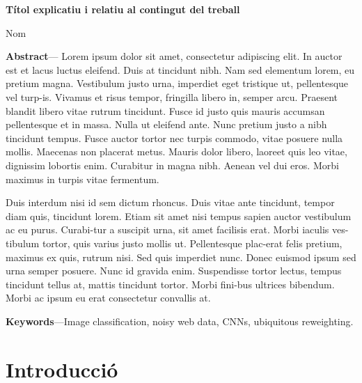﻿\documentclass[10pt,a4paper,twocolumn,twoside]{article}
\begin{document}
{\sffamily
\noindent\textbf{\LARGE Títol explicatiu i relatiu al contingut del treball}
\begin{center}
Nom
\end{center}

\bigskip
\bigskip

\noindent 
\textbf{Abstract}--- Lorem ipsum dolor sit amet, consectetur adipiscing elit. In auctor est et lacus luctus eleifend. Duis at tincidunt nibh. Nam sed elementum lorem, eu pretium magna. Vestibulum justo urna, imperdiet eget tristique ut, pellentesque vel turp-is. Vivamus et risus tempor, fringilla libero in, semper arcu. Praesent blandit libero vitae rutrum tincidunt. Fusce id justo quis mauris accumsan pellentesque et in massa. Nulla ut eleifend ante. Nunc pretium justo a nibh tincidunt tempus. Fusce auctor tortor nec turpis commodo, vitae posuere nulla mollis. Maecenas non placerat metus. Mauris dolor libero, laoreet quis leo vitae, dignissim lobortis enim. Curabitur in magna nibh. Aenean vel dui eros. Morbi maximus in turpis vitae fermentum.

Duis interdum nisi id sem dictum rhoncus. Duis vitae ante tincidunt, tempor diam quis, tincidunt lorem. Etiam sit amet nisi tempus sapien auctor vestibulum ac eu purus. Curabi-tur a suscipit urna, sit amet facilisis erat. Morbi iaculis ves-tibulum tortor, quis varius justo mollis ut. Pellentesque plac-erat felis pretium, maximus ex quis, rutrum nisi. Sed quis imperdiet nunc. Donec euismod ipsum sed urna semper posuere. Nunc id gravida enim. Suspendisse tortor lectus, tempus tincidunt tellus at, mattis tincidunt tortor. Morbi fini-bus ultrices bibendum. Morbi ac ipsum eu erat consectetur convallis at. 

\bigskip

\noindent 
\textbf{Keywords}---Image classification, noisy web data, CNNs, ubiquitous reweighting.
}
\bigskip

{\vrule depth 0pt height 0.5pt width 3cm\hspace{7.5pt}%
%
\hspace{7.5pt}\vrule depth 0pt height 0.5pt width 3cm\relax}

\bigskip


\section{Introducció}
\end{document}
